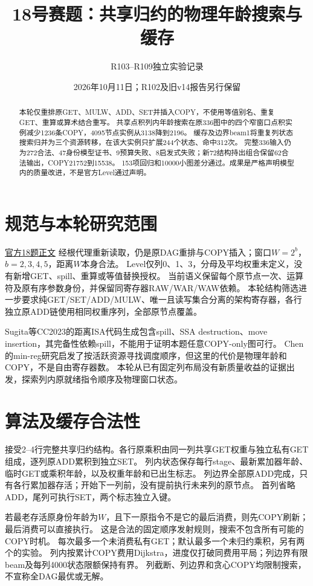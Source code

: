 \documentclass[UTF8,11pt,a4paper]{ctexart}
\title{18号赛题：共享归约的物理年龄搜索与缓存}
\author{R103--R109独立实验记录}
\date{2026年10月11日；R102及旧v14报告另行保留}
\begin{document}
\maketitle
\begin{abstract}
本轮仅重排原GET、MULW、ADD、SET并插入COPY，不使用等值别名、重复GET、重算或算术结合重写。
共享点积列内年龄搜索在原336图中的四个窄窗口点积实例减少1236条COPY，4095节点实例从3138降到2196。
缓存及边界beam1将重复列状态搜索归并为三个资源转移，在该大实例只扩展244个状态、命中312次。
完整336输入仍为272合法、47身份模型证书、9预算失败、8启发式失败；新72结构持出组合保留62合法输出，COPY21752到15538。
153项回归和10000小图差分通过。成果是严格声明模型内的质量改进，不是官方Level通过声明。
\end{abstract}

\section{规范与本轮研究范围}
\href{https://www.chaspark.com/\#/races/competitions/1326690549003280384}{官方18题正文}
经根代理重新读取，仍是原DAG重排与COPY插入；窗口$W=2^b$，$b=2,3,4,5$，距离$W$本身合法。
Level仅列0、1、3，分母及平均权重未定义，没有新增GET、spill、重算或等值替换授权。
当前语义保留每个原节点一次、运算符及原有序参数身份，并保留同寄存器RAW/WAR/WAW依赖。
本轮结构筛选进一步要求纯GET/SET/ADD/MULW、唯一且读写集合分离的架构寄存器，各行独立原ADD链使用相同权重序列，全部原节点覆盖。

Sugita等CC2023的距离ISA代码生成包含spill、SSA destruction、move insertion\cite{sugita}，其完备性依赖spill，不能用于证明本题任意COPY-only图可行。
Chen的min-reg研究\cite{chen}启发了按活跃资源寻找调度顺序，但这里的代价是物理年龄和COPY，不是自由寄存器数。
本轮从已有固定列布局没有新质量收益的证据出发，探索列内原就绪指令顺序及物理窗口状态。

\section{算法及缓存合法性}
接受2--4行完整共享归约结构。各行原乘积由同一列共享GET权重与独立私有GET组成，逐列原ADD累积到独立SET。
列内状态保存每行stage、最新累加器年龄、临时GET或乘积年龄，以及权重年龄和已出生标志。
列边界全部原ADD完成，只有各行累加器存活；开始下一列前，没有提前执行未来列的原节点。
首列省略ADD，尾列可执行SET，两个标志独立入键。

若最老存活原身份年龄为$W$，且下一原指令不是它的最后消费，则先COPY刷新；最后消费可以直接执行。
这是合法的固定顺序发射规则，搜索不包含所有可能的COPY时机。
每次最多一个未消费私有GET；默认最多一个未归约乘积，另有两个的实验。
列内按累计COPY费用Dijkstra，进度仅打破同费用平局；列边界有限beam及每列4000状态限额保持有界。
列截断、列边界和贪心COPY均限制搜索，不宣称全DAG最优或无解。
\end{document}
